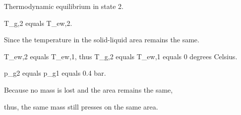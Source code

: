 Thermodynamic equilibrium in state 2.

T_g,2 equals T_ew,2.

Since the temperature in the solid-liquid area remains the same.

T_ew,2 equals T_ew,1, thus T_g,2 equals T_ew,1 equals 0 degrees Celsius.

p_g2 equals p_g1 equals 0.4 bar.

Because no mass is lost and the area remains the same,

thus, the same mass still presses on the same area.